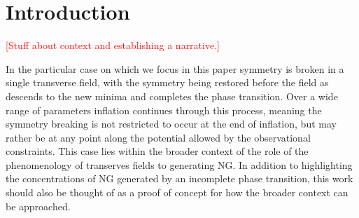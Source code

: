 
\section{Introduction} \label{sec:intro}



\textcolor{red}{[Stuff about context and establishing a narrative.]}




In the particular case on which we focus in this paper symmetry is broken in a single transverse field, with the symmetry being restored before the field as descends to the new minima and completes the phase transition. Over a wide range of parameters inflation continues through this process, meaning the symmetry breaking is not restricted to occur at the end of inflation, but may rather be at any point along the potential allowed by the observational constraints. This case lies within the broader context of the role of the phenomenology of transerves fields to generating NG. In addition to highlighting the concentrations of NG generated by an incomplete phase transition, this work should also be thought of as a proof of concept for how the broader context can be approached.   

